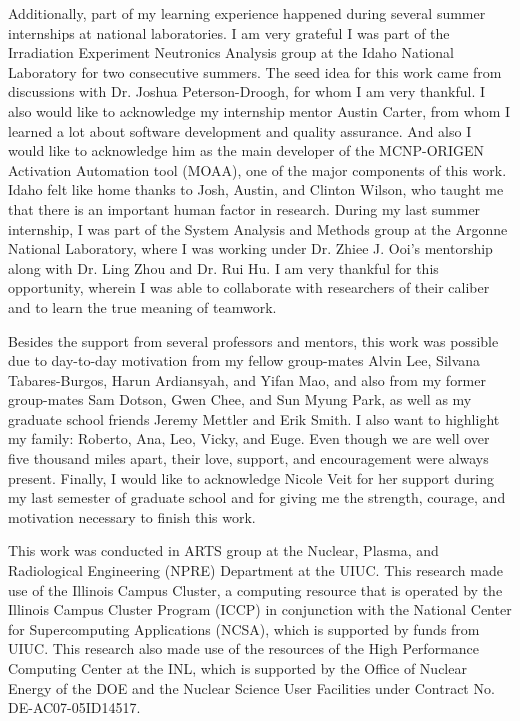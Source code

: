 \documentclass{uiucthesis2021}
\begin{document}
\begin{acknowledgments}
Additionally, part of my learning experience happened during several summer internships at national laboratories.
I am very grateful I was part of the Irradiation Experiment Neutronics Analysis group at the Idaho National Laboratory for two consecutive summers.
The seed idea for this work came from discussions with Dr. Joshua Peterson-Droogh, for whom I am very thankful.
I also would like to acknowledge my internship mentor Austin Carter, from whom I learned a lot about software development and quality assurance.
And also I would like to acknowledge him as the main developer of the MCNP-ORIGEN Activation Automation tool (MOAA), one of the major components of this work.
Idaho felt like home thanks to Josh, Austin, and Clinton Wilson, who taught me that there is an important human factor in research.
During my last summer internship, I was part of the System Analysis and Methods group at the Argonne National Laboratory, where I was working under Dr. Zhiee J. Ooi's mentorship along with Dr. Ling Zhou and Dr. Rui Hu.
I am very thankful for this opportunity, wherein I was able to collaborate with researchers of their caliber and to learn the true meaning of teamwork.

Besides the support from several professors and mentors, this work was possible due to day-to-day motivation from my fellow group-mates Alvin Lee, Silvana Tabares-Burgos, Harun Ardiansyah, and Yifan Mao, and also from my former group-mates Sam Dotson, Gwen Chee, and Sun Myung Park, as well as my graduate school friends Jeremy Mettler and Erik Smith.
I also want to highlight my family: Roberto, Ana, Leo, Vicky, and Euge.
Even though we are well over five thousand miles apart, their love, support, and encouragement were always present.
Finally, I would like to acknowledge Nicole Veit for her support during my last semester of graduate school and for giving me the strength, courage, and motivation necessary to finish this work.

This work was conducted in ARTS group at the Nuclear, Plasma, and Radiological Engineering (NPRE) Department at the \gls*{UIUC}.
This research made use of the Illinois Campus Cluster, a computing resource that is operated by the Illinois Campus Cluster Program (ICCP) in conjunction with the National Center for Supercomputing Applications (NCSA), which is supported by funds from \gls*{UIUC}.
This research also made use of the resources of the High Performance Computing Center at the \gls*{INL}, which is supported by the Office of Nuclear Energy of the \gls*{DOE} and the Nuclear Science User Facilities under Contract No. DE-AC07-05ID14517.

\end{acknowledgments}
\end{document}

